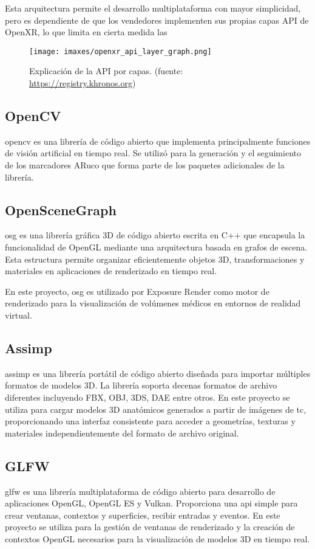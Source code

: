 Esta arquitectura permite el desarrollo multiplataforma con mayor simplicidad, pero es dependiente de que los vendedores implementen sus propias capas API de OpenXR, lo que limita en cierta medida las 

\begin{figure}
  \centering
  \texttt{[image: imaxes/openxr\_api\_layer\_graph.png]}
  \caption{Explicación de la API por capas. (fuente: \href{https://registry.khronos.org/OpenXR/specs/1.0/loader.html}{https://registry.khronos.org})}
  \label{fig:openxrapilayer}
\end{figure}

\subsection{OpenCV}
\acrfull{opencv} es una librería de código abierto que implementa principalmente funciones de visión artificial en tiempo real. Se utilizó para la generación y el seguimiento de los marcadores ARuco que forma parte de los paquetes adicionales de la librería.

\subsection{OpenSceneGraph}
\acrfull{osg} es una librería gráfica 3D de código abierto escrita en C++ que encapsula la funcionalidad de OpenGL mediante una arquitectura basada en grafos de escena. Esta estructura permite organizar eficientemente objetos 3D, transformaciones y materiales en aplicaciones de renderizado en tiempo real.

En este proyecto, \acrshort{osg} es utilizado por Exposure Render como motor de renderizado para la visualización de volúmenes médicos en entornos de realidad virtual.

\subsection{Assimp}
\acrfull{assimp} es una librería portátil de código abierto diseñada para importar múltiples formatos de modelos 3D. La librería soporta decenas formatos de archivo diferentes incluyendo FBX, OBJ, 3DS, DAE entre otros. En este proyecto se utiliza para cargar modelos 3D anatómicos generados a partir de imágenes de \acrshort{tc}, proporcionando una interfaz consistente para acceder a geometrías, texturas y materiales independientemente del formato de archivo original.

\subsection{GLFW}
\acrfull{glfw} es una librería multiplataforma de código abierto para desarrollo de aplicaciones OpenGL, OpenGL ES y Vulkan. Proporciona una \acrshort{api} simple para crear ventanas, contextos y superficies, recibir entradas y eventos. En este proyecto se utiliza para la gestión de ventanas de renderizado y la creación de contextos OpenGL necesarios para la visualización de modelos 3D en tiempo real.

